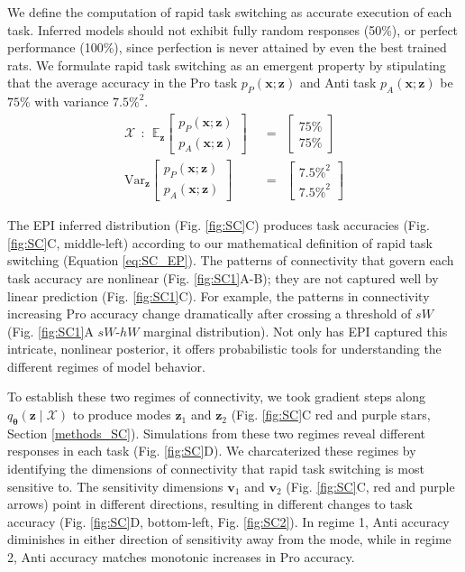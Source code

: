 \documentclass[11pt]{article}
\begin{document}
We define the computation of rapid task switching as accurate execution of each task.  Inferred models should not exhibit fully random responses (50\%), or perfect performance (100\%), since perfection is never attained by even the best trained rats.
We formulate rapid task switching as an emergent property by stipulating that the average accuracy in the Pro task $p_P(\mathbf{x}; \mathbf{z})$ and Anti task $p_A(\mathbf{x}; \mathbf{z})$ be $75\%$ with variance $7.5\%^2$.
\begin{equation}\label{eq:SC_EP}
\begin{split}
\mathcal{X} ~~:~~ \mathbb{E}_{\mathbf{z}}\begin{bmatrix} p_P(\mathbf{x}; \mathbf{z}) \\ p_A(\mathbf{x}; \mathbf{z}) \end{bmatrix}  &~~=~~  \begin{bmatrix} 75\% \\ 75\% \end{bmatrix}  \\ 
 \text{Var}_{\mathbf{z}}\begin{bmatrix} p_P(\mathbf{x}; \mathbf{z}) \\ p_A(\mathbf{x}; \mathbf{z}) \end{bmatrix}  &~~=~~  \begin{bmatrix} 7.5\%^2 \\ 7.5\%^2  \end{bmatrix}
\end{split}
\end{equation}

The EPI inferred distribution  (Fig. \ref{fig:SC}C) produces task accuracies (Fig. \ref{fig:SC}C, middle-left) according to our mathematical definition of rapid task switching (Equation \ref{eq:SC_EP}).
The patterns of connectivity that govern each task accuracy are nonlinear (Fig. \ref{fig:SC1}A-B); they are not captured well by linear prediction (Fig. \ref{fig:SC1}C).
For example, the patterns in connectivity increasing Pro accuracy change dramatically after crossing a threshold of $sW$ (Fig. \ref{fig:SC1}A $sW$-$hW$ marginal distribution).
Not only has EPI captured this intricate, nonlinear posterior, it offers probabilistic tools for understanding the different regimes of model behavior.

To establish these two regimes of connectivity, we took gradient steps along $q_{\bm{\theta}}(\mathbf{z} \mid \mathcal{X})$ to produce modes $\mathbf{z}_1$ and $\mathbf{z}_2$  (Fig. \ref{fig:SC}C red and purple stars, Section \ref{methods_SC}).
Simulations from these two regimes reveal different responses in each task (Fig. \ref{fig:SC}D).
We charcaterized these regimes by identifying the dimensions of connectivity that rapid task switching is most sensitive to.
The sensitivity dimensions $\mathbf{v}_1$ and  $\mathbf{v}_2$ (Fig. \ref{fig:SC}C, red and purple arrows) point in different directions, resulting in different changes to task accuracy (Fig. \ref{fig:SC}D, bottom-left, Fig. \ref{fig:SC2}).
In regime 1, Anti accuracy diminishes in either direction of sensitivity away from the mode, while in regime 2, Anti accuracy matches monotonic increases in Pro accuracy.
\end{document}
